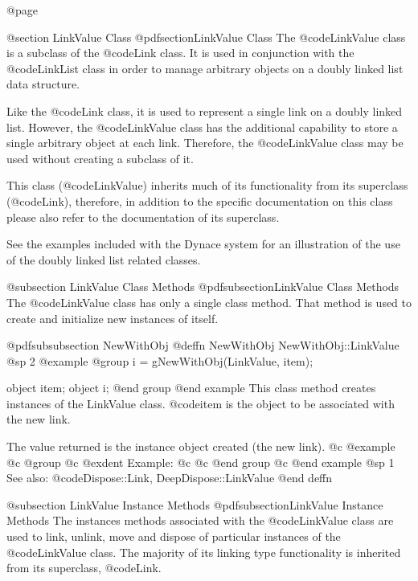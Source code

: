 @page

@section LinkValue Class
@pdfsection{LinkValue Class}
The @code{LinkValue} class is a subclass of the @code{Link} class.  It is
used in conjunction with the @code{LinkList} class in order to manage
arbitrary objects on a doubly linked list data structure.

Like the @code{Link} class, it is used to represent a single link on a
doubly linked list.  However, the @code{LinkValue} class has the
additional capability to store a single arbitrary object at each link.
Therefore, the @code{LinkValue} class may be used without creating a
subclass of it.

This class (@code{LinkValue}) inherits much of its functionality from its
superclass (@code{Link}), therefore, in addition to the specific
documentation on this class please also refer to the documentation of
its superclass.

See the examples included with the Dynace system for an illustration of the
use of the doubly linked list related classes.



@subsection LinkValue Class Methods
@pdfsubsection{LinkValue Class Methods}
The @code{LinkValue} class has only a single class method.  That method
is used to create and initialize new instances of itself.




@pdfsubsubsection {NewWithObj}
@deffn {NewWithObj} NewWithObj::LinkValue
@sp 2
@example
@group
i = gNewWithObj(LinkValue, item);

object  item;
object  i;
@end group
@end example
This class method creates instances of the LinkValue class.  @code{item}
is the object to be associated with the new link.  

The value returned is the instance object created (the new link).
@c @example
@c @group
@c @exdent Example:
@c 
@c @end group
@c @end example
@sp 1
See also:  @code{Dispose::Link, DeepDispose::LinkValue}
@end deffn






@subsection LinkValue Instance Methods
@pdfsubsection{LinkValue Instance Methods}
The instances methods associated with the @code{LinkValue} class are used to
link, unlink, move and dispose of particular instances of the
@code{LinkValue} class.  The majority of its linking type functionality
is inherited from its superclass, @code{Link}.








